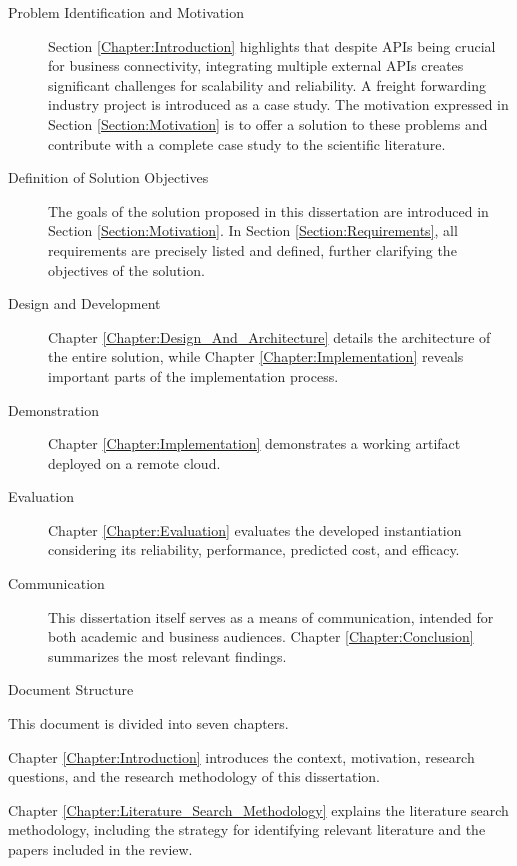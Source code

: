 \documentclass[12pt, reqno]{amsbook}
\makeatletter
\def\section{\@startsection{section}{1}%
      \z@{.5\linespacing\@plus.7\linespacing}{.25\linespacing}%
      {\normalfont\bfseries\flushleft}}
\theoremstyle{definition}
\theoremstyle{definition}
\numberwithin{section}{chapter}
\numberwithin{table}{chapter}
\numberwithin{figure}{chapter}
\makeatother
\begin{document}
\begin{description}
  \item [Problem Identification and Motivation] Section \ref{Chapter:Introduction} highlights that despite \acp{API} being crucial for business connectivity, integrating multiple external \acp{API} creates significant challenges for scalability and reliability. A freight forwarding industry project is introduced as a case study. The motivation expressed in Section \ref{Section:Motivation} is to offer a solution to these problems and contribute with a complete case study to the scientific literature.
  \item [Definition of Solution Objectives] The goals of the solution proposed in this dissertation are introduced in Section \ref{Section:Motivation}. In Section \ref{Section:Requirements}, all requirements are precisely listed and defined, further clarifying the objectives of the solution.
  \item [Design and Development] Chapter \ref{Chapter:Design_And_Architecture} details the architecture of the entire solution, while Chapter \ref{Chapter:Implementation} reveals important parts of the implementation process.
  \item [Demonstration] Chapter \ref{Chapter:Implementation} demonstrates a working artifact deployed on a remote cloud.
  \item [Evaluation] Chapter \ref{Chapter:Evaluation} evaluates the developed instantiation considering its reliability, performance, predicted cost, and efficacy.
  \item [Communication] This dissertation itself serves as a means of communication, intended for both academic and business audiences. Chapter \ref{Chapter:Conclusion} summarizes the most relevant findings.
\end{description}

\section{Document Structure}
\label{Section:Document_Structure}

This document is divided into seven chapters.

Chapter \ref{Chapter:Introduction} introduces the context, motivation, research questions, and the research methodology of this dissertation.

Chapter \ref{Chapter:Literature_Search_Methodology} explains the literature search methodology, including the strategy for identifying relevant literature and the papers included in the review.
\end{document}
